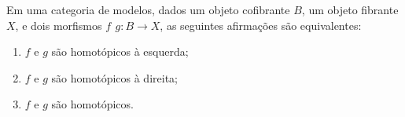 \begin{corol}\label{corol:homotopias_coincidem_se_dom_cofib_cod_fib}
  Em uma categoria de modelos, dados um objeto cofibrante $B$, um objeto fibrante $X$, e dois morfismos $f\,\ g: B \to X$, as seguintes afirmações são equivalentes:
  \begin{enumerate}
  \item $f$ e $g$ são homotópicos à esquerda;
    
  \item $f$ e $g$ são homotópicos à direita;
    
  \item $f$ e $g$ são homotópicos.
  \end{enumerate}
\end{corol}

